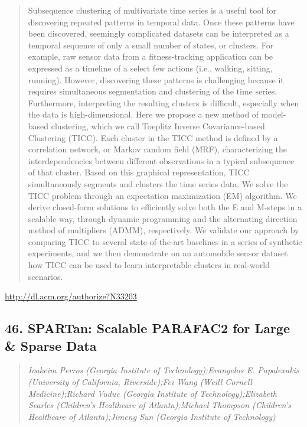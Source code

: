 \documentclass{article}
\begin{document}
\begin{quote}
Subsequence clustering of multivariate time series is a useful tool for discovering repeated patterns in temporal data. Once these patterns have been discovered, seemingly complicated datasets can be interpreted as a temporal sequence of only a small number of states, or clusters. For example, raw sensor data from a fitness-tracking application can be expressed as a timeline of a select few actions (i.e., walking, sitting, running). However, discovering these patterns is challenging because it requires simultaneous segmentation and clustering of the time series. Furthermore, interpreting the resulting clusters is difficult, especially when the data is high-dimensional. Here we propose a new method of model-based clustering, which we call Toeplitz Inverse Covariance-based Clustering (TICC). Each cluster in the TICC method is defined by a correlation network, or Markov random field (MRF), characterizing the interdependencies between different observations in a typical subsequence of that cluster. Based on this graphical representation, TICC simultaneously segments and clusters the time series data. We solve the TICC problem through an expectation maximization (EM) algorithm. We derive closed-form solutions to efficiently solve both the E and M-steps in a scalable way, through dynamic programming and the alternating direction method of multipliers (ADMM), respectively. We validate our approach by comparing TICC to several state-of-the-art baselines in a series of synthetic experiments, and we then demonstrate on an automobile sensor dataset how TICC can be used to learn interpretable clusters in real-world scenarios.
\end{quote}

\href{http://dl.acm.org/authorize?N33203}{http://dl.acm.org/authorize?N33203}

\subsection{46. SPARTan: Scalable PARAFAC2 for Large \& Sparse Data}

\begin{quote}
\footnotesize{\textit{Ioakeim Perros (Georgia Institute of Technology);Evangelos E. Papalexakis (University of California, Riverside);Fei Wang (Weill Cornell Medicine);Richard Vuduc (Georgia Institute of Technology);Elizabeth Searles (Children's Healthcare of Atlanta);Michael Thompson (Children's Healthcare of Atlanta);Jimeng Sun (Georgia Institute of Technology)}}

\end{quote}
\end{document}
